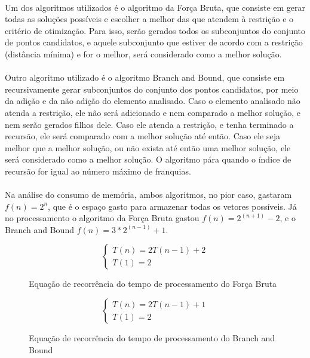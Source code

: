 \documentclass[12pt]{article}
\begin{document}
\paragraph{}Um dos algoritmos utilizados é o algoritmo da Força Bruta, que consiste em gerar todas as soluções possíveis e escolher a melhor das que atendem à restrição e o critério de otimização. Para isso, serão gerados todos os subconjuntos do conjunto de pontos candidatos, e aquele subconjunto que estiver de acordo com a restrição (distância mínima) e for o melhor, será considerado como a melhor solução.

\paragraph{}Outro algoritmo utilizado é o algoritmo Branch and Bound, que consiste em recursivamente gerar subconjuntos do conjunto dos pontos candidatos, por meio da adição e da não adição do elemento analisado. Caso o elemento analisado não atenda a restrição, ele não será adicionado e nem comparado a melhor solução, e nem serão gerados filhos dele. Caso ele atenda a restrição, e tenha terminado a recursão, ele será comparado com a melhor solução até então. Caso ele seja melhor que a melhor solução, ou não exista até então uma melhor solução, ele será considerado como a melhor solução. O algoritmo pára quando o índice de recursão for igual ao número máximo de franquias.

\paragraph{}Na análise do consumo de memória, ambos algoritmos, no pior caso, gastaram 
\(f(n)=2^{n}\), que é o espaço gasto para armazenar todas os vetores possíveis. Já no processamento o algoritmo da Força Bruta gastou \(f(n)=2^{(n+1)}-2\), e o Branch and Bound \(f(n)=3*2^{(n-1)}+1\).

\begin{figure}[H]
    \centering
    \begin{equation}
        \begin{cases}
        T(n) = 2T(n-1)+2 \\
        T(1) = 2
        \end{cases}
    \end{equation}
    \caption{Equação de recorrência do tempo de processamento do Força Bruta}
    \label{fig:eq-1}
\end{figure}

\begin{figure}[H]
    \centering
    \begin{equation}
        \begin{cases}
            T(n) = 2T(n-1)+1\\
            T(1) = 2
        \end{cases}
    \end{equation}
    \caption{Equação de recorrência do tempo de processamento do Branch and Bound}
    \label{fig:eq-2}
\end{figure}
\end{document}
